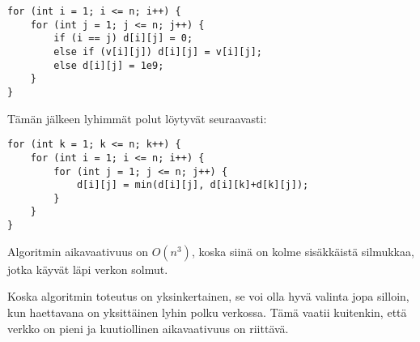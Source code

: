 \begin{lstlisting}
for (int i = 1; i <= n; i++) {
    for (int j = 1; j <= n; j++) {
        if (i == j) d[i][j] = 0;
        else if (v[i][j]) d[i][j] = v[i][j];
        else d[i][j] = 1e9;
    }
}
\end{lstlisting}

Tämän jälkeen lyhimmät polut löytyvät seuraavasti:

\begin{lstlisting}
for (int k = 1; k <= n; k++) {
    for (int i = 1; i <= n; i++) {
        for (int j = 1; j <= n; j++) {
            d[i][j] = min(d[i][j], d[i][k]+d[k][j]);
        }
    }
}
\end{lstlisting}

Algoritmin aikavaativuus on
$O(n^3)$, koska siinä on kolme sisäkkäistä
silmukkaa,
jotka käyvät läpi verkon solmut.

Koska algoritmin toteutus on yksinkertainen,
se voi olla hyvä valinta jopa silloin,
kun haettavana on yksittäinen
lyhin polku verkossa.
Tämä vaatii kuitenkin, että verkko on pieni
ja kuutiollinen aikavaativuus on riittävä.
% 
% 
% 
% 
% 
% 
% 
% 

